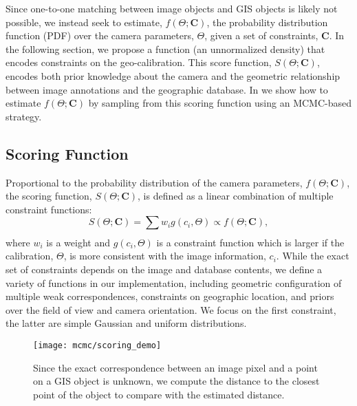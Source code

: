 Since one-to-one matching between image objects and GIS objects is
likely not possible, we instead seek to estimate, $f(\Theta;
\mathbf{C})$, the probability distribution function (PDF) over the
camera parameters, $\Theta$, given a set of constraints, $\mathbf{C}$.
In the following section, we propose a function (an unnormalized
density) that encodes constraints on the geo-calibration.  This score
function, $S(\Theta; \mathbf{C})$, encodes both prior knowledge about
the camera and the geometric relationship between image annotations
and the geographic database.
%
In  we show how to estimate $f(\Theta;\mathbf{C})$ by
sampling from this scoring function using an MCMC-based strategy.

\subsection{Scoring Function}
\label{sec:scoring-function}

Proportional to the probability distribution of the camera parameters,
$f(\Theta; \mathbf{C})$, the scoring function, $S(\Theta;
\mathbf{C})$, is defined as a linear combination of multiple constraint
functions:
%
\begin{equation}
  S(\Theta; \mathbf{C}) = \sum_{}{w_i g(c_i, \Theta)} \propto
  f(\Theta; \mathbf{C}),
\end{equation}
%
where $w_i$ is a weight and $g(c_i, \Theta)$ is a constraint function
which is larger if the calibration, $\Theta$, is more consistent with
the image information, $c_i$. While the exact set of constraints
depends on the image and database contents, we define a variety of
functions in our implementation, including geometric configuration of
multiple weak correspondences, constraints on geographic location, and
priors over the field of view and camera orientation. 
%
We focus on the first
constraint, the latter are simple Gaussian and uniform distributions. 

\begin{figure}
\begin{minipage}[b]{1\linewidth}
  \centering
  \centerline{\texttt{[image: mcmc/scoring\_demo]}}
\end{minipage}
\caption{Since the exact correspondence between an image pixel and a point
  on a GIS object is unknown, we compute the distance to the closest
  point of the object to compare with the estimated distance.}
\label{fig:scoring-demo}
\end{figure}


